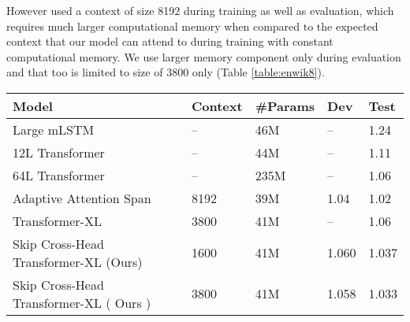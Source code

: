 \documentclass[11pt]{article}
\begin{document}
However \citep{DBLP:conf/acl/SukhbaatarGBJ19} used a context of size 8192 during training as well as evaluation, which requires much larger computational memory when compared to the expected context that our model can attend to during training with constant computational memory. We use larger memory component only during evaluation and that too is limited to size of 3800 only (Table \ref{table:enwik8}).









\begin{table*}
\centering
\begin{tabular}{lllll}
\hline
\textbf{Model} & \textbf{Context} & \textbf{\#Params} & \textbf{Dev} & \textbf{Test}\\
\hline
 Large mLSTM ~\citep{DBLP:conf/iclr/Krause0RL17} & -- & 46M & -- & 1.24 \\
  12L Transformer ~\citep{Al-Rfou_Choe_Constant_Guo_Jones_2019} & -- & 44M  & --  &  1.11  \\
  64L Transformer ~\citep{Al-Rfou_Choe_Constant_Guo_Jones_2019} & -- & 235M  & --  &  1.06  \\
  Adaptive Attention Span~\citep{DBLP:conf/acl/SukhbaatarGBJ19} & 8192 & 39M  & 1.04  & 1.02 \\

\hline
  Transformer-XL ~\citep{DBLP:conf/acl/DaiYYCLS19} & 3800 & 41M  & --  & 1.06   \\
Skip Cross-Head Transformer-XL (Ours) & 1600 & 41M &  1.060 & 1.037  \\
Skip Cross-Head Transformer-XL ( Ours ) & 3800 & 41M & 1.058 &  1.033  \\

\hline
\end{tabular}
\caption{
$Dev$ and $test$ BPC for our proposed model and other approaches on the enwik8 dataset.
}
\label{table:enwik8}
\end{table*}
\end{document}
